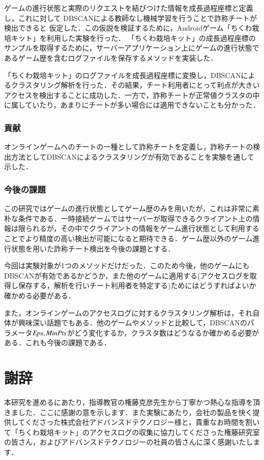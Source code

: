 ゲームの進行状態と実際のリクエストを結びつけた情報を成長過程座標と定義し，これに対して
DBSCANによる教師なし機械学習を行うことで詐称チートが検出できると
仮定した．この仮説を検証するために，Androidゲーム「ちくわ栽培キット」を利用した実験を行った．
「ちくわ栽培キット」の成長過程座標のサンプルを取得するために，サーバーアプリケーション上にゲームの進行状態であるゲーム歴を含むログファイルを保存するメソッドを実装した．

「ちくわ栽培キット」のログファイルを成長過程座標に変換し，DBSCANによるクラスタリング解析を行った．その結果，チート利用者にとって利点が大きいアクセスを検出することに成功した．一方で，詐称チートが正常値クラスタの中に属していたり，あまりにチートが多い場合には適用できないことも分かった．

\section{貢献}
オンラインゲームへのチートの一種として詐称チートを定義し，詐称チートの検出方法としてDBSCANによるクラスタリングが有効であることを実験を通して示した．

\section{今後の課題}
この研究ではゲームの進行状態としてゲーム歴のみを用いたが，これは非常に素朴な条件である．一時接続ゲームではサーバーが取得できるクライアント上の情報は限られるが，その中でクライアントの情報をゲーム進行状態として利用することでより精度の高い検出が可能になると期待できる．ゲーム歴以外のゲーム進行状態を用いた詐称チート検出を今後の課題とする．

今回は実験対象が1つのメソッドだけだった．このため今後，他のゲームにもDBSCANが有効であるかどうか，また他のゲームに適用する(アクセスログを取得し保存する，解析を行いチート利用者を特定する)ためにはどうすればよいか確かめる必要がある．

また，オンラインゲームのアクセスログに対するクラスタリング解析は，それ自体が興味深い話題でもある．他のゲームやメソッドと比較して，DBSCANのパラメータ${\it Eps}, {\it MinPts}$がどう変化するか，クラスタ数はどうなるか確かめる必要がある．これも今後の課題である．

\newpage
\part*{謝辞}
本研究を進めるにあたり，指導教官の権藤克彦先生から丁寧かつ熱心な指導を頂きました．ここに感謝の意を示します．また実験にあたり，会社の製品を快く提供してくださった株式会社アドバンスドテクノロジー様と，貴重なお時間を割いて「ちくわ栽培キット」のアクセスログの収集に協力してくださった権藤研究室の皆さん，およびアドバンスドテクノロジーの社員の皆さんに深く感謝いたします．
